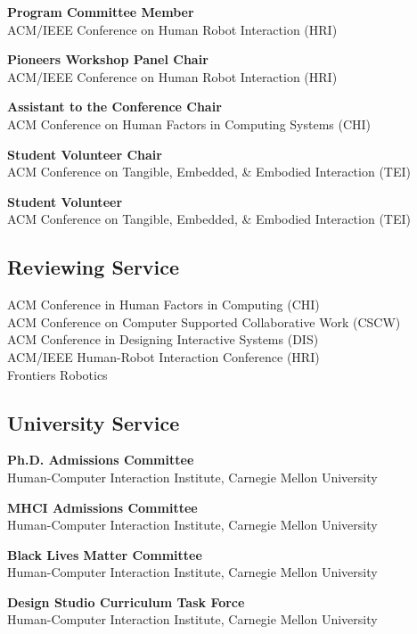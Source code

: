 \documentclass[11pt]{article} %
\begin{document}
 \textbf{Program Committee Member}\\
ACM/IEEE Conference on Human Robot Interaction (HRI)
\medskip

 \textbf{Pioneers Workshop Panel Chair}\\
ACM/IEEE Conference on Human Robot Interaction (HRI)
\medskip

 \textbf{Assistant to the Conference Chair}\\
ACM Conference on Human Factors in Computing Systems (CHI)\\
\medskip

 \textbf{Student Volunteer Chair}\\
ACM Conference on Tangible, Embedded, \& Embodied Interaction (TEI)\\
\medskip

 \textbf{Student Volunteer}\\
ACM Conference on Tangible, Embedded, \& Embodied Interaction (TEI)\\
\medskip

\subsection*{Reviewing Service}
ACM Conference in Human Factors in Computing (CHI)\\
ACM Conference on Computer Supported Collaborative Work (CSCW)\\
ACM Conference in Designing Interactive Systems (DIS)\\
ACM/IEEE Human-Robot Interaction Conference (HRI)\\
Frontiers Robotics

\subsection*{University Service}
 \textbf{Ph.D. Admissions Committee}\\
Human-Computer Interaction Institute, Carnegie Mellon University
\medskip

 \textbf{MHCI Admissions Committee}\\
Human-Computer Interaction Institute, Carnegie Mellon University
\medskip

 \textbf{Black Lives Matter Committee}\\
Human-Computer Interaction Institute, Carnegie Mellon University
\medskip

 \textbf{Design Studio Curriculum Task Force}\\
Human-Computer Interaction Institute, Carnegie Mellon University
\medskip
\end{document}
